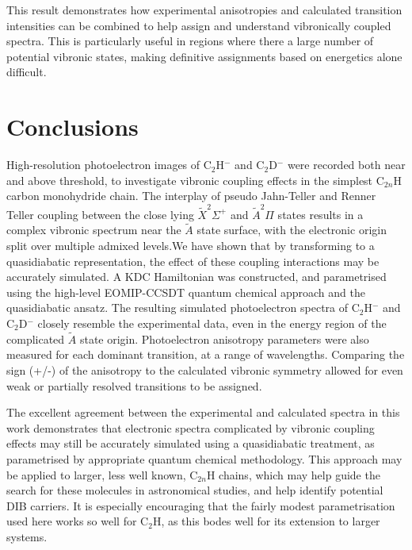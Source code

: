 \documentclass[journal=jpcafh,manuscript=article,layout=onecolumn, 12pt]{achemso}
\begin{document}
This result demonstrates how experimental anisotropies and calculated transition intensities can be combined to help assign and understand vibronically coupled spectra. This is particularly useful in regions where there a large number of potential vibronic states, making definitive assignments based on energetics alone difficult.


 
\section{Conclusions} 
High-resolution photoelectron images of C$_2$H$^-$ and C$_2$D$^-$ were recorded both near and above threshold, to investigate vibronic coupling effects in the simplest C$_{2n}$H carbon monohydride chain. The interplay of pseudo Jahn-Teller and Renner Teller coupling between the close lying $\tilde{X}^2\Sigma^+$ and $\tilde{A}^2\Pi$ states results in a complex vibronic spectrum near the $\tilde{A}$ state surface, with the electronic origin split over multiple admixed levels.We have shown that by transforming to a quasidiabatic representation, the effect of these coupling interactions may be accurately simulated. A KDC Hamiltonian was constructed, and parametrised using the high-level EOMIP-CCSDT quantum chemical approach and the quasidiabatic ansatz. The resulting simulated photoelectron spectra of C$_2$H$^-$ and C$_2$D$^-$ closely resemble the experimental data, even in the energy region of the complicated $\tilde{A}$ state origin. Photoelectron anisotropy parameters were also measured for each dominant transition, at a range of wavelengths. Comparing the sign (+/-) of the anisotropy to the calculated vibronic symmetry allowed for even weak or partially resolved transitions to be assigned.

The excellent agreement between the experimental and calculated spectra in this work
demonstrates that electronic spectra complicated by vibronic coupling effects may still be accurately simulated using a quasidiabatic treatment, as parametrised by appropriate quantum chemical methodology. This approach may be applied to larger, less well known, C$_{2n}$H chains, which may help guide the search for these molecules in astronomical studies, and help identify potential DIB carriers. It is especially encouraging that the fairly modest parametrisation used here works so well for C$_2$H, as this bodes well for its extension to larger systems.
 
\end{document}
